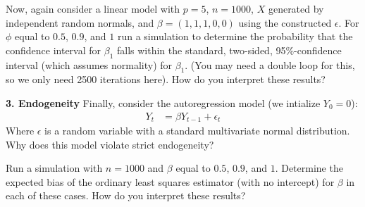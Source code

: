 \documentclass[12pt]{article}
\begin{document}
Now, again consider a linear model with $p=5$, $n=1000$,
$X$ generated by independent random normals, and $\beta = (1,1,1,0,0)$ using
the constructed $\epsilon$. For $\phi$ equal to $0.5$, $0.9$, and $1$ run
a simulation to determine the probability that the confidence
interval for $\beta_1$ falls within the standard,
two-sided, 95\%-confidence interval (which assumes normality) for $\beta_1$.
(You may need a double loop for this, so we only need 2500 iterations here).
How do you interpret these results?

{\bf 3. Endogeneity} Finally, consider the autoregression model (we
intialize $Y_0 = 0$):
\begin{align}
Y_t &= \beta Y_{t-1} + \epsilon_t
\end{align}
Where $\epsilon$ is a random variable with a standard multivariate normal
distribution. Why does this model violate strict endogeneity?

Run a simulation with $n=1000$ and $\beta$ equal to $0.5$, $0.9$, and $1$.
Determine the expected bias of the ordinary least squares estimator
(with no intercept) for $\beta$ in each of these cases.
How do you interpret these results?
\end{document}
